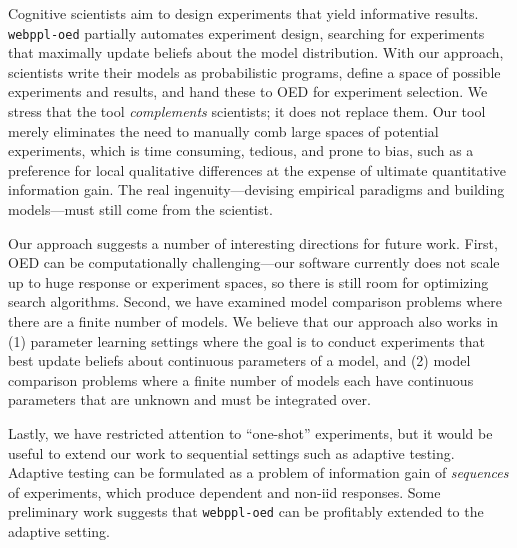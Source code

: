 \documentclass[10pt,letterpaper]{article}
\begin{document}
Cognitive scientists aim to design experiments that yield informative results.
\texttt{webppl-oed} partially automates experiment design, searching for experiments that maximally update beliefs about the model distribution.
With our approach, scientists write their models as probabilistic programs, define a space of possible experiments and results, and hand these to OED for experiment selection.
We stress that the tool \emph{complements} scientists; it does not replace them.
Our tool merely eliminates the need to manually comb large spaces of potential experiments, which is time consuming, tedious, and prone to bias, such as a preference for local qualitative differences at the expense of ultimate quantitative information gain.
The real ingenuity---devising empirical paradigms and building models---must still come from the scientist.

Our approach suggests a number of interesting directions for future work.
First, OED can be computationally challenging---our software currently does not scale up to huge response or experiment spaces, so there is still room for optimizing search algorithms.
Second, we have examined model comparison problems where there are a finite number of models.
We believe that our approach also works in (1) parameter learning settings where the goal is to conduct experiments that best update beliefs about continuous parameters of a model, and (2) model comparison problems where a finite number of models each have continuous parameters that are unknown and must be integrated over.


Lastly, we have restricted attention to ``one-shot'' experiments, but it would be useful to extend our work to sequential settings such as adaptive testing.
Adaptive testing can be formulated as a problem of information gain of \emph{sequences} of experiments, which produce dependent and non-iid responses.
Some preliminary work suggests that \texttt{webppl-oed} can be profitably extended to the adaptive setting.


%

% 


\end{document}
